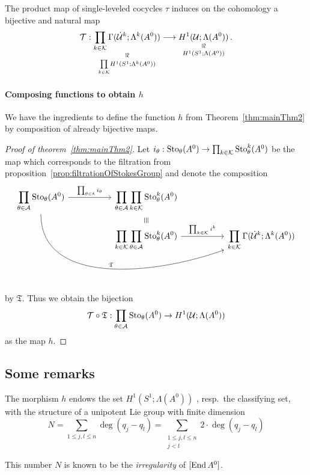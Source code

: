 \begin{cor}
  The product map of single-leveled cocycles $\tau$ induces on the cohomology
  a bijective and natural map
  \[
    \cT:
    \underset{\underset{k\in\cK}\prod H^1(S^1;\Lambda^k(A^0))}{%
      \underset{\text{\rotatebox[origin=c]{-90}{$\cong$}}}{%
        \prod_{k\in\cK}\Gamma(\dot\cU^k;\Lambda^k(A^0))}}
    \longrightarrow
    \underset{H^1(S^1;\Lambda(A^0))}{%
      \underset{\text{\rotatebox[origin=c]{-90}{$\cong$}}}{%
        H^1(\cU;\Lambda(A^0))}}\,.
  \]
\end{cor}
\begin{comment}
  \begin{proof}
    \PROBLEM[Follows from the last lemmas?]
  \end{proof}
\end{comment}
\paragraph{Composing functions to obtain $h$}
We have the ingredients to define the function $h$ from
Theorem~\ref{thm:mainThm2} by composition of already bijective maps.
\begin{proof}[Proof of theorem~\ref{thm:mainThm2}]
  Let $i_\theta:\operatorname{Sto}_\theta(A^0)\to\prod_{k\in\mathcal{K}}\operatorname{Sto}_\theta^k(A^0)$ be the
  map which corresponds to the filtration from
  proposition~\ref{prop:filtrationOfStokesGroup} and
  denote the composition
  \[ \begin{tikzcd}[column sep=1.8cm,row sep=0]
      \displaystyle \prod_{\theta\in\cA}\Sto_\theta(A^0)
      \rar{\prod_{\theta\in\A}i_\theta}
      \arrow[ddrr, out=270,in=200,"\mathfrak{T}"]
      &
      \displaystyle \prod_{\theta\in\cA}\prod_{k\in\cK}\Sto_\theta^k(A^0)
    \\&\text{\rotatebox[origin=c]{-90}{$\equiv$}}
    \\&\displaystyle \prod_{k\in\cK}\prod_{\theta\in\cA}\Sto_\theta^k(A^0)
      \rar{\prod_{k\in\cK}i^k}&
      \displaystyle \prod_{k\in\cK}\Gamma(\dot\cU^k;\Lambda^k(A^0))
  \end{tikzcd} \]
  by $\mathfrak{T}$.
  Thus we obtain the bijection
  \[
    \mathcal{T}\circ\mathfrak{T}:
    \prod_{\theta\in\mathcal{A}}\operatorname{Sto}_\theta(A^0)
    \to
    H^1(\mathcal{U};\Lambda(A^0))
  \]
  as the map $h$.
\end{proof}

\subsection{Some remarks}
\begin{rem}
  The morphism $h$ endows the set $H^1(S^1;\Lambda(A^0))$ , resp.\ the
  classifying set, with the structure of a unipotent Lie group with finite
  dimension
  \[
    N=\sum_{1\leq j,l\leq n}\deg(q_j-q_l)
     =\sum_{\substack{1\leq j,l\leq n\\j<l}}2\cdot\deg(q_j-q_l)
  \]
  \begin{rem}
    This number $N$ is known to be the \emph{irregularity} of $[\operatorname{End} A^0]$.
  \end{rem}
\end{rem}

